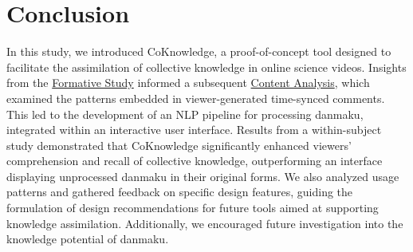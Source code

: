 \section{Conclusion}

In this study, we introduced CoKnowledge, a proof-of-concept tool designed to facilitate the assimilation of collective knowledge in online science videos. Insights from the \hyperref[formative-study]{Formative Study} informed a subsequent \hyperref[content-analysis]{Content Analysis}, which examined the patterns embedded in viewer-generated time-synced comments.
This led to the development of an NLP pipeline for processing danmaku, integrated within an interactive user interface. Results from a within-subject study demonstrated that CoKnowledge significantly enhanced viewers' comprehension and recall of collective knowledge, outperforming an interface displaying unprocessed danmaku in their original forms. We also analyzed usage patterns and gathered feedback on specific design features, guiding the formulation of design recommendations for future tools aimed at supporting knowledge assimilation. Additionally, we encouraged future investigation into the knowledge potential of danmaku.